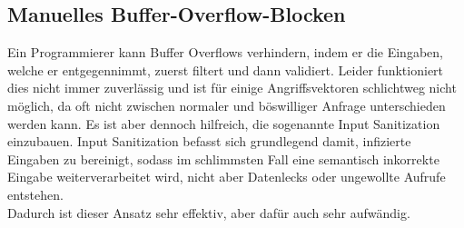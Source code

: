 \subsection{Manuelles Buffer-Overflow-Blocken}
Ein Programmierer kann Buffer Overflows verhindern, indem er die Eingaben,
welche er entgegennimmt, zuerst filtert und dann validiert. Leider funktioniert
dies nicht immer zuverlässig und ist für einige Angriffsvektoren schlichtweg nicht
möglich, da oft nicht zwischen normaler und böswilliger Anfrage unterschieden werden kann. 
Es ist aber dennoch hilfreich, die sogenannte Input Sanitization einzubauen.
Input Sanitization befasst sich grundlegend damit, infizierte Eingaben zu bereinigt, 
sodass im schlimmsten Fall eine semantisch inkorrekte Eingabe weiterverarbeitet
wird, nicht aber Datenlecks oder ungewollte Aufrufe entstehen. \cite{sanitize} \\
Dadurch ist dieser Ansatz sehr effektiv, aber dafür auch sehr aufwändig.




